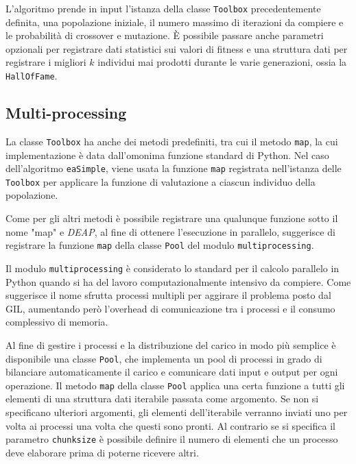 L'algoritmo prende in input l'istanza della classe \verb|Toolbox| precedentemente
definita, una popolazione iniziale, il numero massimo di iterazioni da compiere
e le probabilità di crossover e mutazione. \`E possibile passare anche parametri
opzionali per registrare dati statistici sui valori di fitness e una struttura
dati per registrare i migliori $k$ individui mai prodotti durante le varie
generazioni, ossia la \verb|HallOfFame|.

\subsection{Multi-processing}

La classe \verb|Toolbox| ha anche dei metodi predefiniti, tra cui il metodo
\verb|map|, la cui implementazione è data dall'omonima funzione standard di
Python. Nel caso dell'algoritmo \verb|eaSimple|, viene usata la funzione
\verb|map| registrata nell'istanza delle \verb|Toolbox| per applicare la
funzione di valutazione a ciascun individuo della popolazione.

Come per gli altri metodi è possibile registrare una qualunque funzione sotto
il nome "map" e \textit{DEAP}, al fine di ottenere l'esecuzione in parallelo,
suggerisce di registrare la funzione \verb|map| della classe \verb|Pool| del
modulo \verb|multiprocessing|.

Il modulo \verb|multiprocessing| è considerato lo standard per il calcolo
parallelo in Python quando si ha del lavoro computazionalmente intensivo da
compiere. Come suggerisce il nome sfrutta processi multipli per aggirare il
problema posto dal GIL, aumentando però l'overhead di comunicazione tra i
processi e il consumo complessivo di memoria.

Al fine di gestire i processi e la distribuzione del carico in modo più semplice
è disponibile una classe \verb|Pool|, che implementa un pool di processi in
grado di bilanciare automaticamente il carico e comunicare dati input e output
per ogni operazione. Il metodo \verb|map| della classe \verb|Pool| applica una
certa funzione a tutti gli elementi di una struttura dati iterabile passata come
argomento. Se non si specificano ulteriori argomenti, gli elementi dell'iterabile
verranno inviati uno per volta ai processi una volta che questi sono pronti. Al
contrario se si specifica il parametro \verb|chunksize| è possibile definire il
numero di elementi che un processo deve elaborare prima di poterne ricevere
altri.